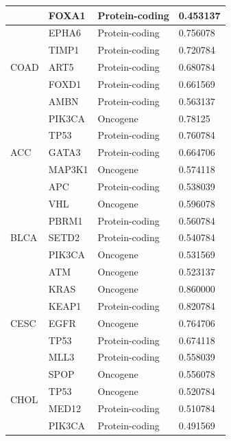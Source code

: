 \begin{table}
\begin{center}
{\begin{tabular}{l|l|l|l}
        & FOXA1 & Protein-coding & 0.453137 \\ %
        \midrule
        \multirow{5}{*}{COAD}& EPHA6 & Protein-coding & 0.756078 \\ %
        & TIMP1 & Protein-coding & 0.720784 \\ %
        & ART5 & Protein-coding & 0.680784 \\ %
        & FOXD1 & Protein-coding & 0.661569 \\ %
        & AMBN & Protein-coding & 0.563137 \\ %
        \midrule
        \multirow{5}{*}{ACC} & PIK3CA & Oncogene & 0.78125 \\ %
        & TP53 & Protein-coding & 0.760784 \\ %
        & GATA3  & Protein-coding & 0.664706 \\ %
        & MAP3K1  & Oncogene & 0.574118 \\ %
        & APC   & Protein-coding & 0.538039 \\ 
        \midrule
        \multirow{5}{*}{BLCA} & VHL & Oncogene & 0.596078 \\ %
        & PBRM1 & Protein-coding  & 0.560784 \\ %
        & SETD2 & Protein-coding & 0.540784 \\ %
        & PIK3CA & Oncogene & 0.531569 \\ %
        & ATM & Oncogene & 0.523137 \\ %
        \midrule
        \multirow{5}{*}{CESC}& KRAS & Oncogene & 0.860000 \\ %
        & KEAP1 & Protein-coding & 0.820784 \\ %
        & EGFR & Oncogene & 0.764706 \\ %
        & TP53 & Protein-coding & 0.674118 \\ %
        & MLL3 & Protein-coding & 0.558039 \\ %
        \midrule
        \multirow{5}{*}{CHOL}& SPOP & Oncogene & 0.556078 \\ %
        & TP53 & Oncogene & 0.520784 \\ %
        & MED12 & Protein-coding & 0.510784 \\ %
        & PIK3CA & Protein-coding & 0.491569 \\ %

\end{tabular}}
\end{center}
\end{table}

